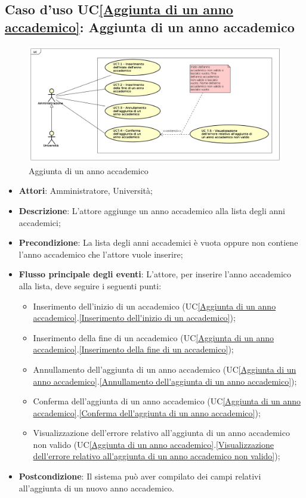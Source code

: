 \subsection{Caso d'uso UC\ref{Aggiunta di un anno accademico}: Aggiunta di un anno accademico}
\begin{figure} [H]
	\centering
	\includegraphics[scale=0.45]{./img/UseCaseDiagram07.png}
	\caption{Aggiunta di un anno accademico}\label{}
\end{figure}
\begin{itemize}
	\item \textbf{Attori}: Amministratore, Università;
	\item \textbf{Descrizione}: L'attore aggiunge un anno accademico alla lista degli anni accademici;
	\item \textbf{Precondizione}: La lista degli anni accademici è vuota oppure non contiene l'anno accademico che l'attore vuole inserire;
	\item \textbf{Flusso principale degli eventi}: L'attore, per inserire l'anno accademico alla lista, deve seguire i seguenti punti:
	\begin{itemize}
		\item Inserimento dell'inizio di un accademico (UC\ref{Aggiunta di un anno accademico}.\ref{Inserimento dell'inizio di un accademico});
		\item Inserimento della fine di un accademico (UC\ref{Aggiunta di un anno accademico}.\ref{Inserimento della fine di un accademico});
		\item Annullamento dell'aggiunta di un anno accademico (UC\ref{Aggiunta di un anno accademico}.\ref{Annullamento dell'aggiunta di un anno accademico});
		\item Conferma dell'aggiunta di un anno accademico (UC\ref{Aggiunta di un anno accademico}.\ref{Conferma dell'aggiunta di un anno accademico});
		\item Visualizzazione dell'errore relativo all'aggiunta di un anno accademico non valido (UC\ref{Aggiunta di un anno accademico}.\ref{Visualizzazione dell'errore relativo all'aggiunta di un anno accademico non valido});
	\end{itemize}
	\item \textbf{Postcondizione}: Il sistema può aver compilato dei campi relativi all'aggiunta di un nuovo anno accademico.
\end{itemize}

